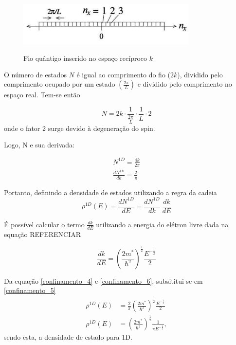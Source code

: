 	\begin{figure}[H]
	  \caption{Fio quântigo inserido no espaço recíproco $k$}
	  \centering
	  \includegraphics[width=0.8\textwidth]{images/figura11.jpg}
	  \label{fig11}
	\end{figure}

	\par O número de estados $N$ é igual ao comprimento do fio ($2k$), dividido pelo comprimento ocupado por um estado $\left(\frac{2\pi}{L}\right)$ e dividido pelo comprimento no espaço real. Tem-se\cite{confinamento3} então

	\begin{equation}
		\label{confinamento_3}
		N = 2k \cdot \frac{1}{\frac{2\pi}{L}} \cdot \frac{1}{L} \cdot 2
	\end{equation}
	onde o fator 2 surge devido à degeneração do spin.

	\par Logo, N e sua derivada:

	\begin{align}
		\label{confinamento_4}
		N^{1D} = \frac{4k}{2\pi}\\
		\frac{dN^{1D}}{dk} = \frac{2}{\pi}		
	\end{align}

	\par Portanto, definindo a densidade de estados utilizando a regra da cadeia
	\begin{equation}
		\label{confinamento_5}
		\rho^{1D}(E) = \frac{dN^{1D}}{dE} = \frac{dN^{1D}}{dk}\ \frac{dk}{dE}
	\end{equation}

	\par É possível calcular o termo $\frac{dk}{dE}$ utilizando a energia do elétron livre dada na equação REFERENCIAR

	\begin{equation}
		\label{confinamento_6}
		 \frac{dk}{dE} = \left(\frac{2m^{\ast}}{\hbar^2}\right)^{\frac{1}{2}} \frac{E^{-\frac{1}{2}}}{2}
	\end{equation}

	\par Da equação \eqref{confinamento_4} e \eqref{confinamento_6}, subsititui-se em \eqref{confinamento_5}
	\begin{align}
		\label{confinamento_7}
		\rho^{1D}(E) &= \frac{2}{\pi} \left(\frac{2m^{\ast}}{\hbar^2}\right)^{\frac{1}{2}} \frac{E^{-\frac{1}{2}}}{2}\\
		\rho^{1D}(E) &= \left(\frac{2m^{\ast}}{\hbar^2}\right)^{\frac{1}{2}} \frac{1}{\pi E^{-\frac{1}{2}}},
	\end{align}
	sendo esta, a densidade de estado para 1D.

